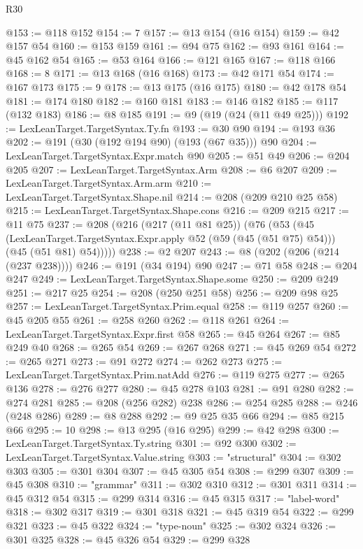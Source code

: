 \begin{lexlean}{R30}
\begin{coremodule}
@153 := @118 @152
@154 := 7
@157 := @13 @154 (@16 @154)
@159 := @42 @157 @54
@160 := @153 @159
@161 := @94 @75
@162 := @93 @161
@164 := @45 @162 @54
@165 := @53 @164
@166 := @121 @165
@167 := @118 @166
@168 := 8
@171 := @13 @168 (@16 @168)
@173 := @42 @171 @54
@174 := @167 @173
@175 := 9
@178 := @13 @175 (@16 @175)
@180 := @42 @178 @54
@181 := @174 @180
@182 := @160 @181
@183 := @146 @182
@185 := @117 (@132 @183)
@186 := @8 @185
@191 := @9 (@19 (@24 (@11 @49 @25)))
@192 := LexLeanTarget.TargetSyntax.Ty.fn
@193 := @30 @90
@194 := @193 @36
@202 := @191 (@30 (@192 @194 @90) (@193 (@67 @35))) @90
@204 := LexLeanTarget.TargetSyntax.Expr.match @90
@205 := @51 @49
@206 := @204 @205
@207 := LexLeanTarget.TargetSyntax.Arm
@208 := @6 @207
@209 := LexLeanTarget.TargetSyntax.Arm.arm
@210 := LexLeanTarget.TargetSyntax.Shape.nil
@214 := @208 (@209 @210 @25 @58)
@215 := LexLeanTarget.TargetSyntax.Shape.cons
@216 := @209 @215
@217 := @11 @75
@237 := @208
    (@216
      (@217 (@11 @81 @25))
      (@76
        (@53
          (@45
            (LexLeanTarget.TargetSyntax.Expr.apply @52 (@59 (@45 (@51 @75) @54)))
            (@45 (@51 @81) @54)))))
@238 := @2 @207
@243 := @8 (@202 (@206 (@214 (@237 @238))))
@246 := @191 (@34 @194) @90
@247 := @71 @58
@248 := @204 @247
@249 := LexLeanTarget.TargetSyntax.Shape.some
@250 := @209 @249
@251 := @217 @25
@254 := @208 (@250 @251 @58)
@256 := @209 @98 @25
@257 := LexLeanTarget.TargetSyntax.Prim.equal
@258 := @119 @257
@260 := @45 @205 @55
@261 := @258 @260
@262 := @118 @261
@264 := LexLeanTarget.TargetSyntax.Expr.first @58
@265 := @45 @264
@267 := @85 @249 @40
@268 := @265 @54
@269 := @267 @268
@271 := @45 @269 @54
@272 := @265 @271
@273 := @91 @272
@274 := @262 @273
@275 := LexLeanTarget.TargetSyntax.Prim.natAdd
@276 := @119 @275
@277 := @265 @136
@278 := @276 @277
@280 := @45 @278 @103
@281 := @91 @280
@282 := @274 @281
@285 := @208 (@256 @282) @238
@286 := @254 @285
@288 := @246 (@248 @286)
@289 := @8 @288
@292 := @9 @25 @35 @66
@294 := @85 @215 @66
@295 := 10
@298 := @13 @295 (@16 @295)
@299 := @42 @298
@300 := LexLeanTarget.TargetSyntax.Ty.string
@301 := @92 @300
@302 := LexLeanTarget.TargetSyntax.Value.string
@303 := "structural"
@304 := @302 @303
@305 := @301 @304
@307 := @45 @305 @54
@308 := @299 @307
@309 := @45 @308
@310 := "grammar"
@311 := @302 @310
@312 := @301 @311
@314 := @45 @312 @54
@315 := @299 @314
@316 := @45 @315
@317 := "label-word"
@318 := @302 @317
@319 := @301 @318
@321 := @45 @319 @54
@322 := @299 @321
@323 := @45 @322
@324 := "type-noun"
@325 := @302 @324
@326 := @301 @325
@328 := @45 @326 @54
@329 := @299 @328

\end{coremodule}
\end{lexlean}

